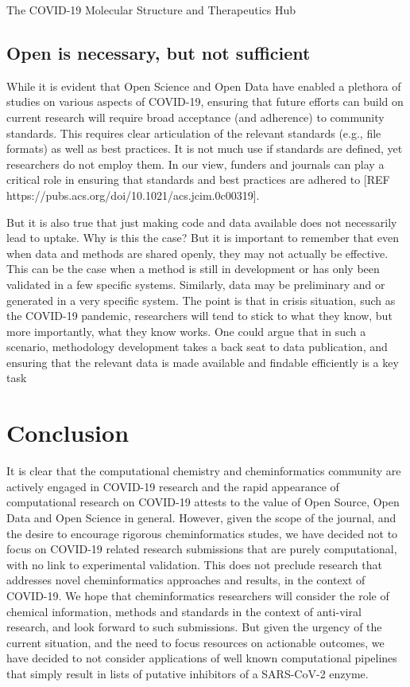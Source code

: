 \documentclass{bmcart}
\begin{document}
The COVID-19
Molecular Structure and Therapeutics Hub


\subsection*{Open is necessary, but not sufficient}

While it is evident that Open Science and Open Data have enabled a
plethora of studies on various aspects of COVID-19, ensuring that
future efforts can build on current research will require broad
acceptance (and adherence) to community standards. This requires clear
articulation of the relevant standards (e.g., file formats) as well as
best practices. It is not much use if standards are defined, yet
researchers do not employ them. In our view, funders and journals can
play a critical role in ensuring that standards and best practices are
adhered to [REF https://pubs.acs.org/doi/10.1021/acs.jcim.0c00319].

But it is also true that just making code and data available does not
necessarily lead to uptake. Why is this the case? 
But it is important to remember that even when data and methods are
shared openly, they may not actually be effective. This can be the
case when a method is still in development or has only been validated
in a few specific systems. Similarly, data may be preliminary and or
generated in a very specific system. The point is that in crisis
situation, such as the COVID-19 pandemic, researchers will tend to
stick to what they know, but more importantly, what they know
works. One could argue that in such a scenario, methodology
development takes a back seat to data publication, and ensuring that
the relevant data is made available and findable efficiently is a key task




\section*{Conclusion}

It is clear that the computational chemistry and cheminformatics
community are actively engaged in COVID-19 research and the rapid
appearance of computational research on COVID-19 attests to the value
of Open Source, Open Data and Open Science in general. However, given
the scope of the journal, and the desire to encourage rigorous
cheminformatics studes, we have decided not to focus on COVID-19
related research submissions that are purely computational, with no
link to experimental validation. This does not preclude research that
addresses novel cheminformatics approaches and results, in the context
of COVID-19. We hope that cheminformatics researchers will consider
the role of chemical information, methods and standards in the context
of anti-viral research, and look forward to such submissions. But
given the urgency of the current situation, and the need to focus
resources on actionable outcomes, we have decided to not consider
applications of well known computational pipelines that simply result
in lists of putative inhibitors of a SARS-CoV-2 enzyme.
\end{document}
